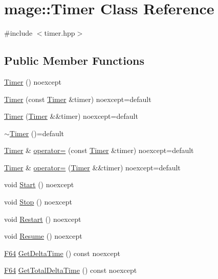 \hypertarget{classmage_1_1_timer}{}\section{mage\+:\+:Timer Class Reference}
\label{classmage_1_1_timer}


{\ttfamily \#include $<$timer.\+hpp$>$}

\subsection*{Public Member Functions}
\begin{DoxyCompactItemize}
\item 
\hyperlink{classmage_1_1_timer_ad529d2329ae911c8b4c64efd05a71dd0}{Timer} () noexcept
\item 
\hyperlink{classmage_1_1_timer_ae792c5a546deb35e5e65ed7fe6a8d281}{Timer} (const \hyperlink{classmage_1_1_timer}{Timer} \&timer) noexcept=default
\item 
\hyperlink{classmage_1_1_timer_a9fde919b6040a044748e98f59e18bece}{Timer} (\hyperlink{classmage_1_1_timer}{Timer} \&\&timer) noexcept=default
\item 
\hyperlink{classmage_1_1_timer_a66d6964a6d42eef72f7312f1233e4f74}{$\sim$\+Timer} ()=default
\item 
\hyperlink{classmage_1_1_timer}{Timer} \& \hyperlink{classmage_1_1_timer_a607d4bce80a92977bc8394c8774a6434}{operator=} (const \hyperlink{classmage_1_1_timer}{Timer} \&timer) noexcept=default
\item 
\hyperlink{classmage_1_1_timer}{Timer} \& \hyperlink{classmage_1_1_timer_a38d7c1fe4c4061c56286183032dc67d8}{operator=} (\hyperlink{classmage_1_1_timer}{Timer} \&\&timer) noexcept=default
\item 
void \hyperlink{classmage_1_1_timer_a60e9e329f1e71a6e25351ff6dbcc1b92}{Start} () noexcept
\item 
void \hyperlink{classmage_1_1_timer_aa880e02bfeea2d082a5f34e497bd6500}{Stop} () noexcept
\item 
void \hyperlink{classmage_1_1_timer_a47e6893e733911624ebf54d5f88cd3fd}{Restart} () noexcept
\item 
void \hyperlink{classmage_1_1_timer_ab3cfad4fd61d52852181f7a060069892}{Resume} () noexcept
\item 
\hyperlink{namespacemage_ad26233bbec640deda836e572c1a23708}{F64} \hyperlink{classmage_1_1_timer_a49d36d6d60530a55af210abd01577365}{Get\+Delta\+Time} () const noexcept
\item 
\hyperlink{namespacemage_ad26233bbec640deda836e572c1a23708}{F64} \hyperlink{classmage_1_1_timer_a21ee76bc048a3c80f1bfbbbd807e97a7}{Get\+Total\+Delta\+Time} () const noexcept
\end{DoxyCompactItemize}
